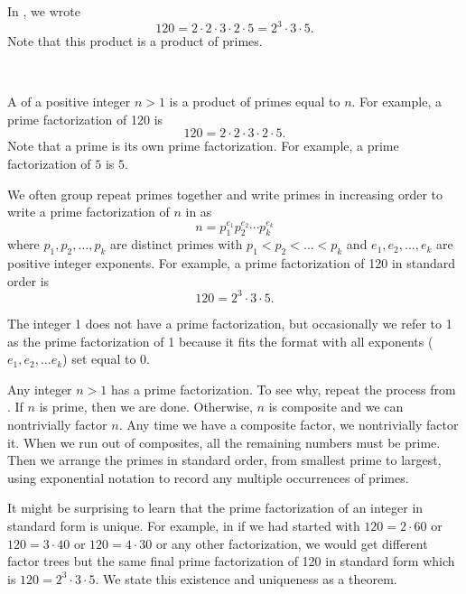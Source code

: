 In , we wrote $$ 120 = 2 \cdot 2 \cdot 3 \cdot 2 \cdot 5 = 2^3 \cdot 3 \cdot 5.$$  Note that this product is a product of primes.

\begin{defn}
\label{defn_prime_fact}
~
    \begin{apart}
        \item A  of a positive integer $n>1$ is a product of primes equal to $n$. For example, a prime factorization of 120 is
        $$120 = 2 \cdot 2 \cdot 3 \cdot 2 \cdot 5.$$  Note that a prime is its own prime factorization.  For example, a prime factorization of $5$ is $5$.
        \item We often group repeat primes together and write primes in increasing order to write a prime factorization of $n$ in  as
        $$n = p_1^{e_1} p_2^{e_2} \cdots p_k^{e_k}$$
        where $p_1, p_2, \ldots, p_k$ are distinct primes with 
        $p_1 < p_2 < \ldots < p_k$
        and $e_1, e_2, \ldots, e_k$ are positive integer exponents.  For example, a prime factorization of 120 in standard order is $$120 = 2^3 \cdot 3 \cdot 5.$$  
        \item The integer 1 does not have a prime factorization, but occasionally we refer to 1 as the prime factorization of 1 because it fits the format with all exponents ($e_1, e_2, \ldots e_k$) set equal to 0.
    \end{apart}
\end{defn}

Any integer $n>1$ has a prime factorization.  To see why, repeat the process from . If $n$ is prime, then we are done.  Otherwise, $n$ is composite and we can nontrivially factor $n$.  Any time we have a composite factor, we nontrivially factor it.  When we run out of composites, all the remaining numbers must be prime.  Then we arrange the primes in standard order, from smallest prime to largest, using exponential notation to record any multiple occurrences of primes. 

It might be surprising to learn that the prime factorization of an integer in standard form is unique.  For example, in  if we had started with $120 = 2 \cdot 60$ or $120 = 3 \cdot 40$ or $120 = 4 \cdot 30$ or any other factorization, we would get different factor trees but the same final prime factorization of 120 in standard form which is $120 = 2^3 \cdot 3 \cdot 5.$ We state this existence and uniqueness as a theorem.


